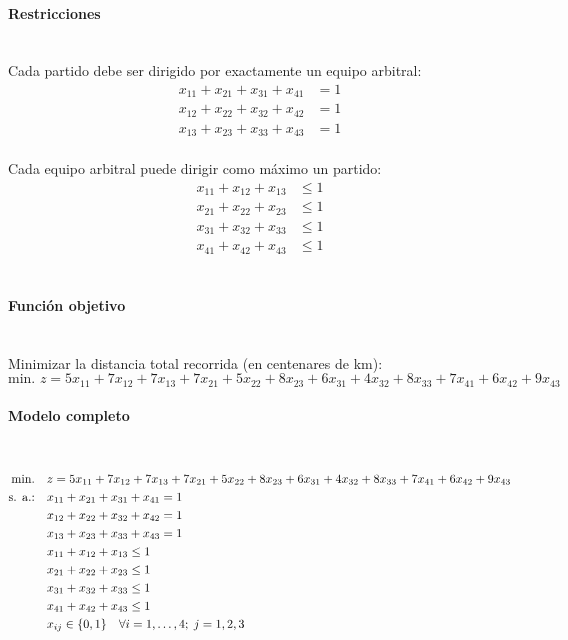 \paragraph{Restricciones}\mbox{}\\
Cada partido debe ser dirigido por exactamente un equipo arbitral:
\begin{align}
x_{11}+x_{21}+x_{31}+x_{41} &= 1 \\
x_{12}+x_{22}+x_{32}+x_{42} &= 1 \\
x_{13}+x_{23}+x_{33}+x_{43} &= 1
\end{align}
\\
Cada equipo arbitral puede dirigir como máximo un partido:
\begin{align}
x_{11}+x_{12}+x_{13} &\leq 1 \\
x_{21}+x_{22}+x_{23} &\leq 1 \\
x_{31}+x_{32}+x_{33} &\leq 1 \\
x_{41}+x_{42}+x_{43} &\leq 1
\end{align}
\\

\paragraph{Función objetivo}\mbox{}\\
Minimizar la distancia total recorrida (en centenares de km):
\begin{equation}
\mbox{min. } z = 5x_{11}+7x_{12}+7x_{13}+7x_{21}+5x_{22}+8x_{23}+6x_{31}+4x_{32}+8x_{33}+7x_{41}+6x_{42}+9x_{43}
\end{equation}

\paragraph{Modelo completo}\mbox{}\\
\begin{align}
\mbox{min.} \quad 
& z = 5x_{11}+7x_{12}+7x_{13}+7x_{21}+5x_{22}+8x_{23}+6x_{31}+4x_{32}+8x_{33}+7x_{41}+6x_{42}+9x_{43} \notag \\
\mbox{s. a.:} \quad 
& x_{11}+x_{21}+x_{31}+x_{41} = 1 \notag \\
& x_{12}+x_{22}+x_{32}+x_{42} = 1 \notag \\
& x_{13}+x_{23}+x_{33}+x_{43} = 1 \notag \\
& x_{11}+x_{12}+x_{13} \leq 1 \notag \\
& x_{21}+x_{22}+x_{23} \leq 1 \notag \\
& x_{31}+x_{32}+x_{33} \leq 1 \notag \\
& x_{41}+x_{42}+x_{43} \leq 1 \notag \\
& x_{ij} \in \{0,1\} \quad \forall i=1,\dots,4;\; j=1,2,3 \notag
\end{align}


